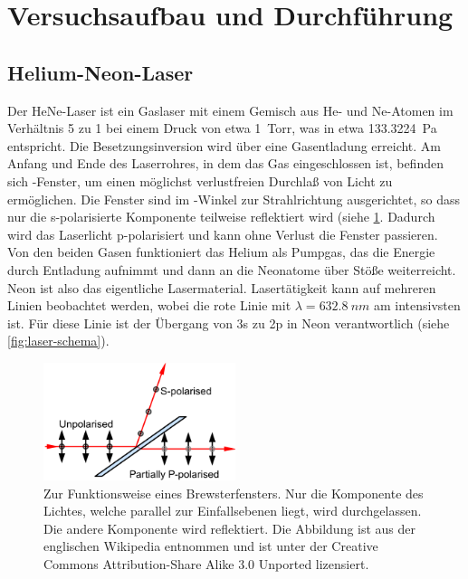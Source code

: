\section{Versuchsaufbau und Durchführung}

\subsection{Helium-Neon-Laser}
Der HeNe-Laser ist ein Gaslaser mit einem Gemisch aus He- und Ne-Atomen
im Verhältnis 5 zu 1 bei einem Druck von etwa \SI{1}{Torr}, was in etwa
\SI{133.3224}{Pa} entspricht.  Die Besetzungsinversion wird über
eine Gasentladung erreicht.  Am Anfang und Ende des Laserrohres, in dem
das Gas eingeschlossen ist, befinden sich -Fenster, um 
einen möglichst verlustfreien Durchlaß von Licht zu ermöglichen.  Die Fenster
sind im -Winkel zur Strahlrichtung ausgerichtet, so dass
nur die s-polarisierte Komponente teilweise reflektiert wird (siehe
\cref{fig:brewster-window}.  Dadurch wird das Laserlicht p-polarisiert
und kann ohne Verlust die Fenster passieren. Von den beiden Gasen 
funktioniert das Helium als Pumpgas, das die Energie durch Entladung 
aufnimmt und
dann an die Neonatome über Stöße weiterreicht.  
Neon ist also das eigentliche
Lasermaterial.  Lasertätigkeit kann auf mehreren Linien beobachtet
werden, wobei die rote Linie mit $\lambda = \SI{632.8}{nm}$ am
intensivsten ist.  Für diese Linie ist der Übergang von 3s zu 2p in Neon
verantwortlich (siehe \cref{fig:laser-schema}).

\begin{figure}[h]
  \centering
  \includegraphics[width=0.5\textwidth]{figures/Brewster_window}
  \caption{Zur Funktionsweise eines Brewsterfensters. Nur die 
    Komponente des Lichtes, welche parallel zur Einfallsebenen liegt, 
    wird 
    durchgelassen. Die andere Komponente wird reflektiert. 
    Die Abbildung ist aus
    der englischen Wikipedia entnommen \cite{wikipedia:brewster_angle}
    und ist unter der Creative Commons Attribution-Share Alike 3.0
    Unported lizensiert.}
  \label{fig:brewster-window}
\end{figure}

